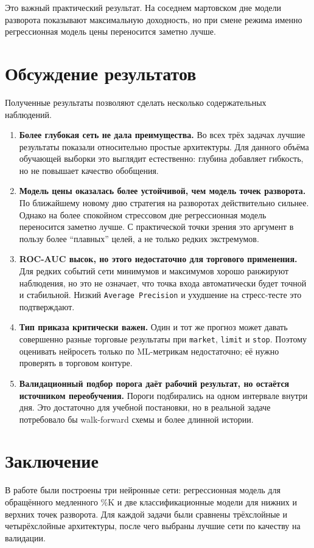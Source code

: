 \documentclass[12pt,a4paper]{article}
\begin{document}
Это важный практический результат. На соседнем мартовском дне модели разворота показывают максимальную доходность, но при смене режима именно регрессионная модель цены переносится заметно лучше.

\section{Обсуждение результатов}
Полученные результаты позволяют сделать несколько содержательных наблюдений.

\begin{enumerate}
    \item \textbf{Более глубокая сеть не дала преимущества.} Во всех трёх задачах лучшие результаты показали относительно простые архитектуры. Для данного объёма обучающей выборки это выглядит естественно: глубина добавляет гибкость, но не повышает качество обобщения.

    \item \textbf{Модель цены оказалась более устойчивой, чем модель точек разворота.} По ближайшему новому дню стратегия на разворотах действительно сильнее. Однако на более спокойном стрессовом дне регрессионная модель переносится заметно лучше. С практической точки зрения это аргумент в пользу более ``плавных'' целей, а не только редких экстремумов.

    \item \textbf{ROC-AUC высок, но этого недостаточно для торгового применения.} Для редких событий сети минимумов и максимумов хорошо ранжируют наблюдения, но это не означает, что точка входа автоматически будет точной и стабильной. Низкий \texttt{Average Precision} и ухудшение на стресс-тесте это подтверждают.

    \item \textbf{Тип приказа критически важен.} Один и тот же прогноз может давать совершенно разные торговые результаты при \texttt{market}, \texttt{limit} и \texttt{stop}. Поэтому оценивать нейросеть только по ML-метрикам недостаточно; её нужно проверять в торговом контуре.

    \item \textbf{Валидационный подбор порога даёт рабочий результат, но остаётся источником переобучения.} Пороги подбирались на одном интервале внутри дня. Это достаточно для учебной постановки, но в реальной задаче потребовало бы walk-forward схемы и более длинной истории.
\end{enumerate}

\section{Заключение}
В работе были построены три нейронные сети: регрессионная модель для обращённого медленного \%K и две классификационные модели для нижних и верхних точек разворота. Для каждой задачи были сравнены трёхслойные и четырёхслойные архитектуры, после чего выбраны лучшие сети по качеству на валидации.
\end{document}
